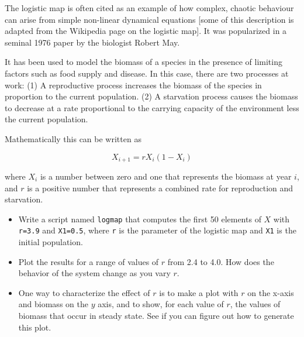 \begin{ex}
The logistic map is often cited as an example of how complex, chaotic
behaviour can arise from simple non-linear dynamical equations [some
of this description is adapted from the Wikipedia page on the logistic
map]. It was popularized in a seminal 1976 paper by the biologist
Robert May.

It has been used to model the biomass of a
species in the presence of limiting factors such as food supply and
disease. In this case, there are two processes at work:
(1) A reproductive process increases the biomass of the species
in proportion to the current population.
(2) A starvation process causes the biomass to decrease at a rate
proportional to the carrying capacity of the environment less the
current population.

Mathematically this can be written as

\[ X_{i+1} = r X_i (1-X_i) \]

where $X_i$ is a number between zero and one that represents the
biomass at year $i$, and $r$ is a positive number that represents a
combined rate for reproduction and starvation.

\begin{itemize}

\item Write a script named {\tt logmap} that computes the first 50
elements of $X$ with {\tt r=3.9} and {\tt X1=0.5}, where
{\tt r} is the parameter of the logistic map and {\tt X1} is the
initial population.

\item Plot the results for a range of values of $r$ from 2.4 to 4.0.
How does the behavior of the system change as you vary $r$.

\item One way to characterize the effect of $r$ is to make a plot
with $r$ on the x-axis and biomass on the $y$ axis, and to show,
for each value of $r$, the values of biomass that occur in steady
state. See if you can figure out how to generate this plot.

\end{itemize}

\end{ex}
